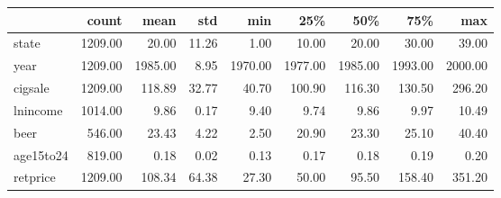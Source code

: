 \begin{tabular}{lrrrrrrrr}
\toprule
 & count & mean & std & min & 25\% & 50\% & 75\% & max \\
\midrule
state & 1209.00 & 20.00 & 11.26 & 1.00 & 10.00 & 20.00 & 30.00 & 39.00 \\
year & 1209.00 & 1985.00 & 8.95 & 1970.00 & 1977.00 & 1985.00 & 1993.00 & 2000.00 \\
cigsale & 1209.00 & 118.89 & 32.77 & 40.70 & 100.90 & 116.30 & 130.50 & 296.20 \\
lnincome & 1014.00 & 9.86 & 0.17 & 9.40 & 9.74 & 9.86 & 9.97 & 10.49 \\
beer & 546.00 & 23.43 & 4.22 & 2.50 & 20.90 & 23.30 & 25.10 & 40.40 \\
age15to24 & 819.00 & 0.18 & 0.02 & 0.13 & 0.17 & 0.18 & 0.19 & 0.20 \\
retprice & 1209.00 & 108.34 & 64.38 & 27.30 & 50.00 & 95.50 & 158.40 & 351.20 \\
\bottomrule
\end{tabular}
